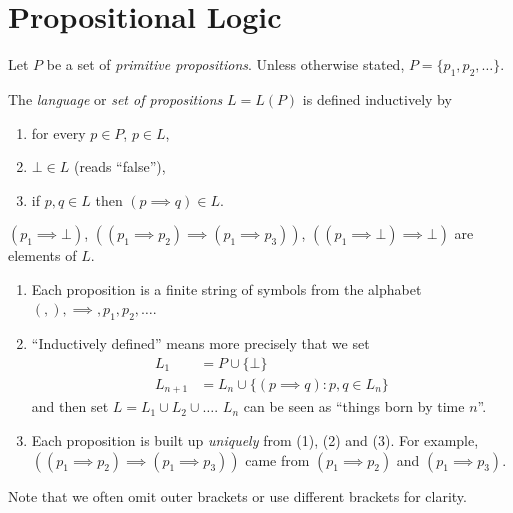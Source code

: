 \documentclass[a4paper]{article}
\begin{document}


\tableofcontents

\section{Propositional Logic}

Let \(P\) be a set of \emph{primitive propositions}. Unless otherwise stated, \(P = \{p_1, p_2, \dots \}\).

\begin{definition}[Language]
  The \emph{language} or \emph{set of propositions} \(L = L(P)\) is defined inductively by
  \begin{enumerate}
  \item for every \( p \in P\), \(p \in L\),
  \item \(\bot \in L\) (reads ``false''),
  \item if \(p, q \in L\) then \((p \implies q) \in L\).
  \end{enumerate}
\end{definition}

\begin{eg}
  \((p_1 \implies \bot)\), \(((p_1 \implies p_2) \implies (p_1 \implies p_3))\), \(((p_1 \implies \bot) \implies \bot)\) are elements of \(L\).
\end{eg}

\begin{note}\leavevmode
  \begin{enumerate}
  \item Each proposition is a finite string of symbols from the alphabet \((, ), \implies, p_1, p_2, \dots\).
  \item ``Inductively defined'' means more precisely that we set
    \begin{align*}
      L_1 &= P \cup \{\bot\} \\
      L_{n + 1} &= L_n \cup \{(p \implies q): p, q \in L_n\}
    \end{align*}
    and then set \(L = L_1 \cup L_2 \cup \dots\). \(L_n\) can be seen as ``things born by time \(n\)''.
  \item Each proposition is built up \emph{uniquely} from (1), (2) and (3). For example, \(((p_1 \implies p_2) \implies (p_1 \implies p_3))\) came from \((p_1 \implies p_2)\) and \((p_1 \implies p_3)\).
  \end{enumerate}
\end{note}

Note that we often omit outer brackets or use different brackets for clarity.
\end{document}
